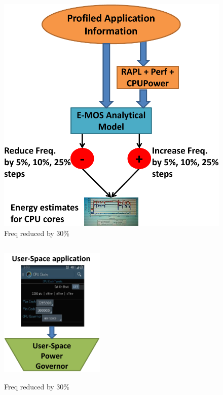 \begin{figure}[h]
  \begin{center}
\includegraphics[width=\linewidth]{figs/EMOS-new-crop.pdf}
  \end{center}
  \vspace{-0.1in}
  \caption{Freq reduced by 30\%}
	\label{fig:reduce-freq}
\end{figure}

\begin{figure}[h]
  \begin{center}
\includegraphics[width=5cm,height=7cm]{figs/user-space-crop.pdf}
  \end{center}
  \vspace{-0.1in}
  \caption{Freq reduced by 30\%}
	\label{fig:reduce-freq}
\end{figure}

